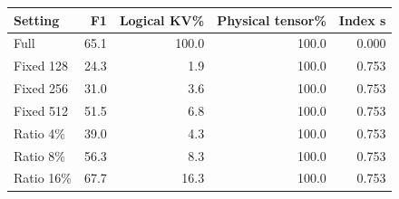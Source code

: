 \begin{tabular}{@{}lrrrr@{}}
\toprule
Setting & F1 & Logical KV\% & Physical tensor\% & Index s \\
\midrule
Full & 65.1 & 100.0 & 100.0 & 0.000 \\
Fixed 128 & 24.3 & 1.9 & 100.0 & 0.753 \\
Fixed 256 & 31.0 & 3.6 & 100.0 & 0.753 \\
Fixed 512 & 51.5 & 6.8 & 100.0 & 0.753 \\
Ratio 4\% & 39.0 & 4.3 & 100.0 & 0.753 \\
Ratio 8\% & 56.3 & 8.3 & 100.0 & 0.753 \\
Ratio 16\% & 67.7 & 16.3 & 100.0 & 0.753 \\
\bottomrule
\end{tabular}
